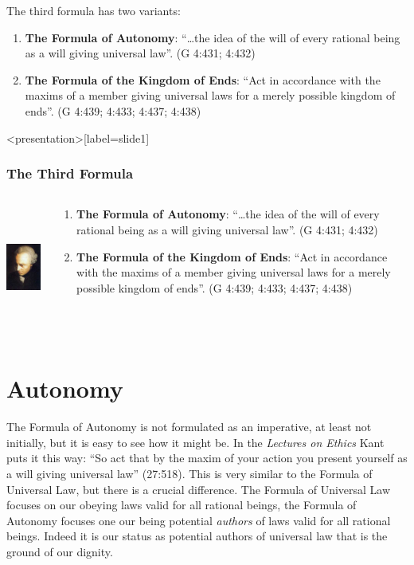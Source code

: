 The third formula has two variants:
\begin{enumerate}
    \item \textbf{The Formula of Autonomy}: ``\ldots the idea of the will of every rational being as a will giving universal law''. (G 4:431; 4:432)
    \item \textbf{The Formula of the Kingdom of Ends}: ``Act in accordance with the maxims of a member giving universal laws for a merely possible kingdom of ends''. (G 4:439; 4:433; 4:437; 4:438)
\end{enumerate}

\change

\begin{frame}<presentation>[label=slide1]
    \frametitle{The Third Formula}
        \begin{columns}
            \begin{column}{3cm}
                \includegraphics[height=4cm]{../../../graphics/kant.jpg}
            \end{column}
            \begin{column}{7cm}
                \begin{enumerate}
                    \item \textbf{The Formula of Autonomy}: ``\ldots the idea of the will of every rational being as a will giving universal law''. (G 4:431; 4:432)
                    \item \textbf{The Formula of the Kingdom of Ends}: ``Act in accordance with the maxims of a member giving universal laws for a merely possible kingdom of ends''. (G 4:439; 4:433; 4:437; 4:438)
                \end{enumerate}
            \end{column}
        \end{columns}
\end{frame}

\section{Autonomy}

The Formula of Autonomy is not formulated as an imperative, at least not initially, but it is easy to see how it might be. In the \emph{Lectures on Ethics} Kant puts it this way: ``So act that by the maxim of your action you present yourself as a will giving universal law'' (27:518). This is very similar to the Formula of Universal Law, but there is a crucial difference. The Formula of Universal Law focuses on our obeying laws valid for all rational beings, the Formula of Autonomy focuses one our being potential \emph{authors} of laws valid for all rational beings. Indeed it is our status as potential authors of universal law that is the ground of our dignity.

